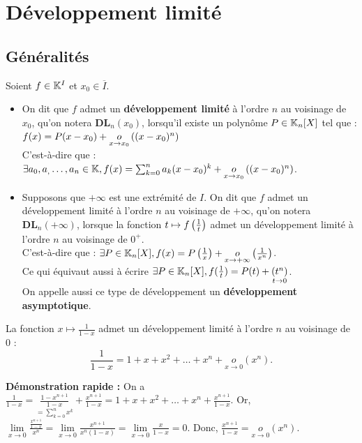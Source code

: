 \documentclass[12pt, a4paper]{report}
\begin{document}
\chapter{Développement limité}

\section{Généralités}

\begin{definition}
    Soient $f \in \mathbb{K}^I$ et $x_0 \in \overline{I}$.

    \begin{itemize}
        \item On dit que $f$ admet un \textbf{développement limité} à l'ordre $n$ au voisinage de $x_0$, qu'on notera $\mathbf{DL}_n(x_0)$, lorsqu'il existe un polynôme $P \in \mathbb{K}_n[X]$ tel que : $f(x) = P(x - x_0) + \underset{x\to x_0}{o}\left((x - x_0)^n\right)$ \\C'est-à-dire que :$\exists a_0,a_,\dots,a_n \in \mathbb{K}, f(x) = \sum_{k=0}^{n}a_k(x-x_0)^k + \underset{x\to x_0}{o}\left((x - x_0)^n\right)$.
        \item Supposons que $+\infty$ est une extrémité de $I$. On dit que $f$ admet un développement limité à l'ordre $n$ au voisinage de $+\infty$, qu'on notera $\mathbf{DL}_n(+\infty)$, lorsque la fonction $t\mapsto f\left(\frac{1}{t}\right)$ admet un développement limité à l'ordre $n$ au voisinage de $0^+$.\\C'est-à-dire que : $\exists P \in \mathbb{K}_n[X], f(x) = P\left(\frac{1}{x}\right) + \underset{x\to +\infty}{o}\left(\frac{1}{x^n}\right)$.\\Ce qui équivaut aussi à écrire $\exists P\in \mathbb{K}_n[X], f(\frac1t) = P(t)+\underset{t\to 0}{\left(t^n\right)}$.\\On appelle aussi ce type de développement un \textbf{développement asymptotique}.
    \end{itemize}
\end{definition}

\begin{example}
    La fonction $x\mapsto \frac{1}{1-x}$ admet un développement limité à l'ordre $n$ au voisinage de $0$ :
    \[\frac{1}{1-x} = 1 + x + x^2 + \dots + x^n + \underset{x\to 0}{o}(x^n).\]

    \textbf{Démonstration rapide :} On a $\frac{1}{1-x} = \underset{=\sum_{k=0}^{n}x^k}{\frac{1 - x^{n+1}}{1-x}} + \frac{x^{n+1}}{1-x} = 1 + x + x^2 + \dots + x^n + \frac{x^{n+1}}{1-x}$. Or, $\lim\limits_{x\to 0} \frac{\frac{x^{n+1}}{1-x}}{x^n} = \lim\limits_{x\to 0} \frac{x^{n+1}}{x^n(1-x)} = \lim\limits_{x\to 0} \frac{x}{1-x} = 0$. Donc, $\frac{x^{n+1}}{1-x} = \underset{x\to 0}{o}(x^n)$.
\end{example}
\end{document}
